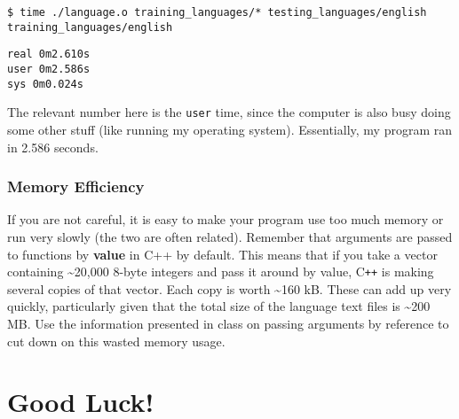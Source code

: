 \documentclass[]{article}
\begin{document}
\texttt{\$ time ./language.o training_languages/* testing_languages/english}
\texttt{training_languages/english}


\texttt{real     0m2.610s}\\
\texttt{user     0m2.586s}\\
\texttt{sys      0m0.024s}

The relevant number here is the \texttt{user} time, since the computer
is also busy doing some other stuff (like running my operating system).
Essentially, my program ran in 2.586 seconds.

\subsubsection{Memory Efficiency}\label{memory-efficiency}

If you are not careful, it is easy to make your program use too much
memory or run very slowly (the two are often related). Remember that
arguments are passed to functions by \textbf{value} in C++ by default.
This means that if you take a vector containing \textasciitilde{}20,000
8-byte integers and pass it around by value, C\texttt{++} is making several
copies of that vector. Each copy is worth \textasciitilde{}160 kB. These
can add up very quickly, particularly given that the total size of the
language text files is \textasciitilde{}200 MB. Use the information
presented in class on passing arguments by reference to cut down on this
wasted memory usage.

\section{Good Luck!}\label{good-luck}
\end{document}
